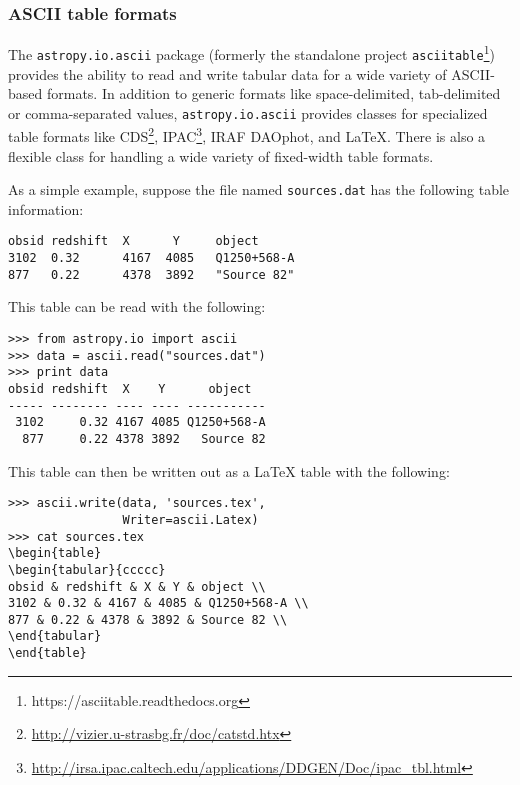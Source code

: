 \documentclass[traditabstract]{aa}
\begin{document}


\subsubsection{ASCII table formats}
\label{sec:ascii}

The \texttt{astropy.io.ascii} package (formerly the standalone project
\texttt{asciitable}\footnote{https://asciitable.readthedocs.org}) provides the
ability to read and write tabular data for a wide variety of ASCII-based
formats.  In addition to generic formats like space-delimited, tab-delimited or
comma-separated values, \texttt{astropy.io.ascii} provides classes for specialized
table formats like
CDS\footnote{\url{http://vizier.u-strasbg.fr/doc/catstd.htx}},
IPAC\footnote{\url{http://irsa.ipac.caltech.edu/applications/DDGEN/Doc/ipac_tbl.html}},
IRAF DAOphot, and LaTeX.  There is also a flexible class for handling
a wide variety of fixed-width table formats.

As a simple example, suppose the file named \verb|sources.dat| has the following
table information:

\begin{verbatim}
obsid redshift  X      Y     object
3102  0.32      4167  4085   Q1250+568-A
877   0.22      4378  3892   "Source 82"
\end{verbatim}

This table can be read with the following:

\begin{verbatim}
>>> from astropy.io import ascii
>>> data = ascii.read("sources.dat")
>>> print data
obsid redshift  X    Y      object
----- -------- ---- ---- -----------
 3102     0.32 4167 4085 Q1250+568-A
  877     0.22 4378 3892   Source 82
\end{verbatim}

This table can then be written out as a LaTeX table with the following:

\begin{verbatim}
>>> ascii.write(data, 'sources.tex',
                Writer=ascii.Latex)
>>> cat sources.tex
\begin{table}
\begin{tabular}{ccccc}
obsid & redshift & X & Y & object \\
3102 & 0.32 & 4167 & 4085 & Q1250+568-A \\
877 & 0.22 & 4378 & 3892 & Source 82 \\
\end{tabular}
\end{table}
\end{verbatim}
\end{document}
